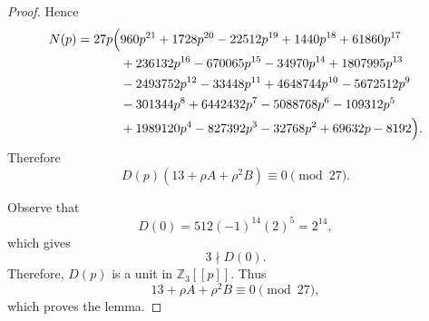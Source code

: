 \documentclass[10pt,a4paper]{amsart}
\begin{document}
\begin{proof}
Hence
\fi
\begin{align*}
N(p)
=
27p\Bigl(
&960p^{21}
+1728p^{20}
-22512p^{19}
+1440p^{18}
+61860p^{17}
\\
&+
236132p^{16}
-670065p^{15}
-34970p^{14}
+1807995p^{13}
\\
&-
2493752p^{12}
-33448p^{11}
+4648744p^{10}
-5672512p^9
\\
&-
301344p^8
+6442432p^7
-5088768p^6
-109312p^5
\\
&+
1989120p^4
-827392p^3
-32768p^2
+69632p
-8192
\Bigr).
\end{align*}
Therefore
\begin{equation*}
D(p)\left(13+\rho A+\rho^2B\right)
\equiv0\pmod{27}.
\end{equation*}

Observe that
\begin{equation*}
D(0)
=
512(-1)^{14}(2)^5
=
2^{14},
\end{equation*}
which gives
\begin{equation*}
3\nmid D(0).
\end{equation*}
Therefore, $D(p)$ is a unit in $\mathbb{Z}_3[[p]]$. Thus
\begin{equation*}
13+\rho A+\rho^2B
\equiv0\pmod{27},
\end{equation*}
which proves the lemma.
\end{proof}
\end{document}
